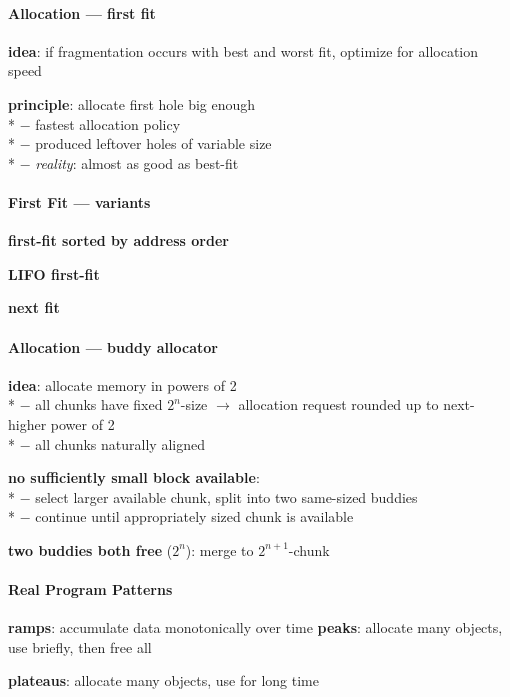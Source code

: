 \paragraph{Allocation --- first fit}
\begin{items}
  \item \textbf{idea}: if fragmentation occurs with best and worst fit, optimize for allocation speed
  \item \textbf{principle}: allocate first hole big enough \\*
    $ - $ fastest allocation policy \\*
    $ - $ produced leftover holes of variable size \\*
    $ - $ \emph{reality}: almost as good as best-fit
\end{items}

\paragraph{First Fit --- variants}
\begin{items}
  \item \textbf{first-fit sorted by address order}
  \item \textbf{LIFO first-fit}
  \item \textbf{next fit}
\end{items}

\paragraph{Allocation --- buddy allocator}
\begin{items}
  \item \textbf{idea}: allocate memory in powers of 2 \\*
    $ - $ all chunks have fixed $ 2^n $-size $ \to $ allocation request rounded up to next-higher power of 2 \\*
    $ - $ all chunks naturally aligned
  \item \textbf{no sufficiently small block available}: \\*
    $ - $ select larger available chunk, split into two same-sized buddies \\*
    $ - $ continue until appropriately sized chunk is available
  \item \textbf{two buddies both free} ($ 2^n $): merge to $ 2^{n+1} $-chunk
\end{items}

\paragraph{Real Program Patterns}
\begin{items}
  \item \textbf{ramps}: accumulate data monotonically over time
  \itm \textbf{peaks}: allocate many objects, use briefly, then free all
  \item \textbf{plateaus}: allocate many objects, use for long time
\end{items}

